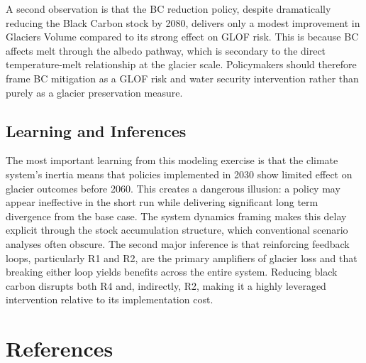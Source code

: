 \documentclass[12pt, a4paper]{article}
\begin{document}
A second observation is that the BC reduction policy, despite dramatically reducing the Black Carbon stock by 2080, delivers only a modest improvement in Glaciers Volume compared to its strong effect on GLOF risk. This is because BC affects melt through the albedo pathway, which is secondary to the direct temperature-melt relationship at the glacier scale. Policymakers should therefore frame BC mitigation as a GLOF risk and water security intervention rather than purely as a glacier preservation measure.

\subsection{Learning and Inferences}

The most important learning from this modeling exercise is that the climate system's inertia means that policies implemented in 2030 show limited effect on glacier outcomes before 2060. This creates a dangerous illusion: a policy may appear ineffective in the short run while delivering significant long term divergence from the base case. The system dynamics framing makes this delay explicit through the stock accumulation structure, which conventional scenario analyses often obscure. The second major inference is that reinforcing feedback loops, particularly R1 and R2, are the primary amplifiers of glacier loss and that breaking either loop yields benefits across the entire system. Reducing black carbon disrupts both R4 and, indirectly, R2, making it a highly leveraged intervention relative to its implementation cost.

\clearpage
\section*{References}
\end{document}
